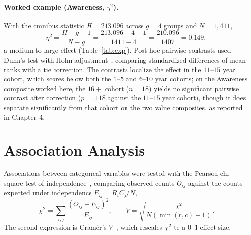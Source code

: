 \paragraph{Worked example (Awareness, $\eta^2$).} With the omnibus statistic $H=213.096$ across $g=4$ groups and $N=1{,}411$,
\begin{equation}
  \eta^2 = \frac{H-g+1}{N-g} = \frac{213.096-4+1}{1411-4} = \frac{210.096}{1407} = 0.149,
\end{equation}
a medium-to-large effect (Table~\ref{tab:exp}). Post-hoc pairwise contrasts used Dunn's test with Holm adjustment~\parencite{Dunn_1964}, comparing standardized differences of mean ranks with a tie correction. The contrasts localize the effect in the $11$--$15$ year cohort, which scores below both the $1$--$5$ and $6$--$10$ year cohorts; on the Awareness composite worked here, the $16+$ cohort ($n=18$) yields no significant pairwise contrast after correction ($p=.118$ against the $11$--$15$ year cohort), though it does separate significantly from that cohort on the two value composites, as reported in Chapter~4.

\section{Association Analysis}

Associations between categorical variables were tested with the Pearson chi-square test of independence~\parencite{Pearson_1900}, comparing observed counts $O_{ij}$ against the counts expected under independence $E_{ij}=R_iC_j/N$,
\begin{equation}
  \chi^2 = \sum_{i,j}\frac{\left(O_{ij}-E_{ij}\right)^2}{E_{ij}},
  \qquad
  V = \sqrt{\frac{\chi^2}{N\left(\min(r,c)-1\right)}} .
\end{equation}
The second expression is Cram\'er's $V$~\parencite{Cramer_1946}, which rescales $\chi^2$ to a $0$--$1$ effect size.

